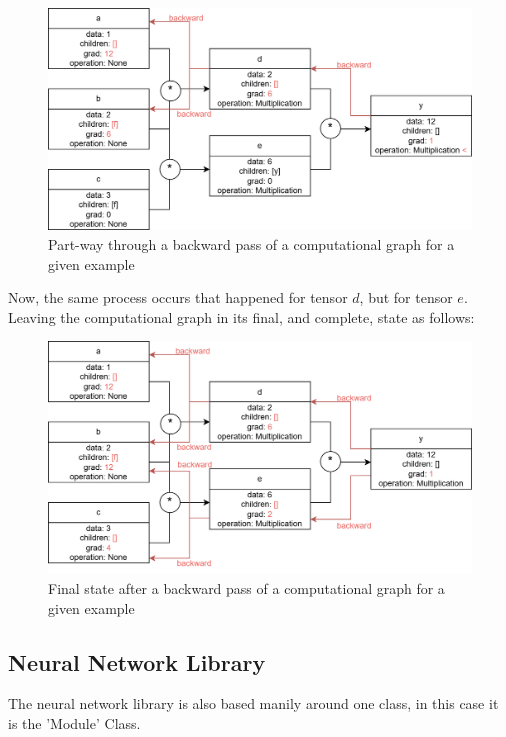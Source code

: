\documentclass{article}
\begin{document}
    \begin{figure}[h]
        \centering
        \includegraphics[scale=0.2]{Tensor-backward1-example.drawio.png}
        \caption{Part-way through a backward pass of a computational graph for a given example}
    \end{figure}

    Now, the same process occurs that happened for tensor $d$, but for tensor $e$. Leaving the computational graph in its final, and complete, state as follows:

    \begin{figure}[h]
        \centering
        \includegraphics[scale=0.2]{Tensor-backward2-example.drawio.png}
        \caption{Final state after a backward pass of a computational graph for a given example}
    \end{figure}

    \pagebreak
    \subsection{Neural Network Library} \label{NNLibDesignStage}

    The neural network library is also based manily around one class, in this case it is the 'Module' Class. 
\end{document}
